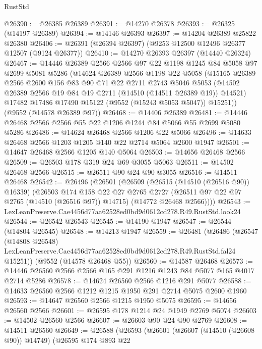 \begin{lexlean}{RustStd}
\begin{coremodule}
@26390 := @26385 @26389
@26391 := @14270 @26378
@26393 := @26325 (@14197 @26389)
@26394 := @14146 @26393
@26397 := @14204 @26389 @25822 @26380
@26406 := @26391 (@26394 @26397) (@9253 @12500 @12496 @26377 @12507 (@9124 @26377))
@26410 := @14270 @26393 @26397 (@14440 @26324)
@26467 := @14446
    @26389
    @2566
    @2566
    @97
    @22
    @1198
    @1245
    @84
    @5058
    @97
    @2699
    @5081
    @5286
    (@14624
      @26389
      @2566
      @1198
      @22
      @5058
      (@15165
        @26389
        @2566
        @2600
        @156
        @83
        @90
        @71
        @22
        @2711
        @2743
        @5046
        @5053
        (@14502 @26389 @2566 @19 @84 @19 @2711 (@14510 (@14511 @26389 @19)) @14521)
        @17482
        @17486
        @17490
        @15122
        (@9552 (@15243 @5053 @5047))
        @15251))
    (@9552 (@14578 @26389 @97))
@26468 := @14406 @26389
@26481 := @14446 @26468 @2566 @2566 @55 @22 @1206 @1244 @84 @5066 @55 @2699 @5080 @5286
@26486 := @14624 @26468 @2566 @1206 @22 @5066
@26496 := @14633 @26468 @2566 @1203 @1205 @140 @22 @2714 @5064 @2600 @1947
@26501 := @14647 @26468 @2566 @1205 @140 @5064
@26503 := @14656 @26468 @2566
@26509 := @26503 @178 @319 @24 @69 @3055 @5063
@26511 := @14502 @26468 @2566
@26515 := @26511 @90 @24 @90 @3055
@26516 := @14511 @26468
@26542 := @26496
    (@26501
      (@26509
        (@26515 (@14510 (@26516 @90)) @16339)
        (@26503
          @174
          @158
          @22
          @27
          @2765
          @2727
          (@26511 @97 @22 @97 @2765 (@14510 (@26516 @97)) @14715)
          (@14772 @26468 @2566))))
@26543 := LexLeanPreserve.Cae4456d77aa62528ed0bd9d0612cd278.R49.RustStd.look24
@26544 := @26542 @26543
@26545 := @14190 @1947
@26547 := @26544 (@14804 @26545)
@26548 := @14213 @1947
@26559 := @26481
    (@26486
      (@26547
        (@14808 @26548)
        LexLeanPreserve.Cae4456d77aa62528ed0bd9d0612cd278.R49.RustStd.fal24
        @15251))
    (@9552 (@14578 @26468 @55))
@26560 := @14587 @26468
@26573 := @14446 @26560 @2566 @2566 @165 @291 @1216 @1243 @84 @5077 @165 @4017 @2714 @5286
@26578 := @14624 @26560 @2566 @1216 @291 @5077
@26588 := @14633 @26560 @2566 @1212 @1215 @1950 @291 @2714 @5075 @2600 @1960
@26593 := @14647 @26560 @2566 @1215 @1950 @5075
@26595 := @14656 @26560 @2566
@26601 := @26595 @178 @1214 @24 @1949 @2769 @5074
@26603 := @14502 @26560 @2566
@26607 := @26603 @90 @24 @90 @2769
@26608 := @14511 @26560
@26649 := @26588
    (@26593
      (@26601
        (@26607 (@14510 (@26608 @90)) @14749)
        (@26595
          @174
          @893
          @22

\end{coremodule}
\end{lexlean}
